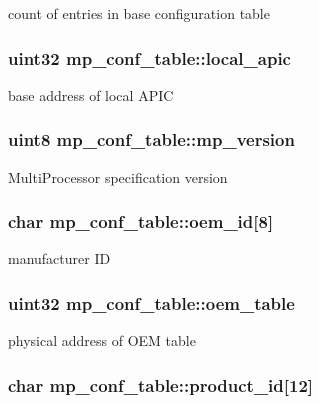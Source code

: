 \label{structmp__conf__table_a89991590f1e56c3938c341e07682f5d3}
count of entries in base configuration table \hypertarget{structmp__conf__table_ac801dc07338148b9752563295c5cfd2c}{
\subsubsection[{local\_\-apic}]{\setlength{\rightskip}{0pt plus 5cm}uint32 {\bf mp\_\-conf\_\-table::local\_\-apic}}}
\label{structmp__conf__table_ac801dc07338148b9752563295c5cfd2c}
base address of local APIC \hypertarget{structmp__conf__table_a991b257536fb47235ce85a98037fa77e}{
\subsubsection[{mp\_\-version}]{\setlength{\rightskip}{0pt plus 5cm}uint8 {\bf mp\_\-conf\_\-table::mp\_\-version}}}
\label{structmp__conf__table_a991b257536fb47235ce85a98037fa77e}
MultiProcessor specification version \hypertarget{structmp__conf__table_a91c6bb3623dd54a5b90e4cf99a2bbc0d}{
\subsubsection[{oem\_\-id}]{\setlength{\rightskip}{0pt plus 5cm}char {\bf mp\_\-conf\_\-table::oem\_\-id}\mbox{[}8\mbox{]}}}
\label{structmp__conf__table_a91c6bb3623dd54a5b90e4cf99a2bbc0d}
manufacturer ID \hypertarget{structmp__conf__table_a6851b422f90446a3c1010d610ae66ea8}{
\subsubsection[{oem\_\-table}]{\setlength{\rightskip}{0pt plus 5cm}uint32 {\bf mp\_\-conf\_\-table::oem\_\-table}}}
\label{structmp__conf__table_a6851b422f90446a3c1010d610ae66ea8}
physical address of OEM table \hypertarget{structmp__conf__table_afdc8029c16e64c7da8ce4b85366118ef}{
\subsubsection[{product\_\-id}]{\setlength{\rightskip}{0pt plus 5cm}char {\bf mp\_\-conf\_\-table::product\_\-id}\mbox{[}12\mbox{]}}}
